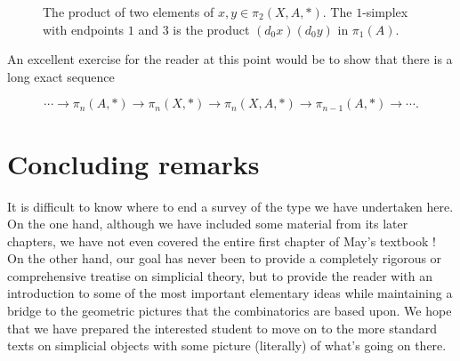 \documentclass[12pt]{article}
\theoremstyle{plain}
\theoremstyle{definition}
\theoremstyle{remark}
\begin{document}
\begin{figure}[!htp]
\begin{center}
\end{center}
\caption{The product of two elements of $x,y\in \pi_2(X,A,*)$. The $1$-simplex with endpoints $1$ and $3$ is the product $(d_0x)(d_0y)$ in $\pi_1(A)$.}\label{F: fig28}
\end{figure}


An excellent exercise for the reader at this point would be to show that there is a long exact sequence 

$$\cdots \to\pi_n(A,*)\to\pi_n(X,*)\to\pi_n(X,A,*)\to \pi_{n-1}(A,*)\to\cdots .$$


\section{Concluding remarks}\label{S: concluding}

It is difficult to know where to end a survey of the type we have undertaken here. On the one hand, although we have included some material from its later chapters,
we have not even covered the entire first chapter of May's textbook \cite{MAY67}! On the other hand, our goal has never been to provide a completely rigorous or comprehensive treatise on simplicial theory, but to provide the reader with an introduction to some of the most important elementary ideas while maintaining a bridge to the geometric pictures that the combinatorics are based upon. We hope that we have prepared the interested student to move on to the more standard texts on simplicial objects with some picture (literally) of what's going on there. 
\end{document}
